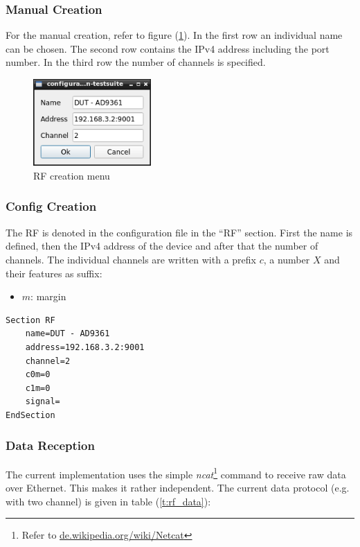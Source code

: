 \documentclass[10pt,a4paper]{article}
\begin{document}
		\subsubsection{Manual Creation}
		For the manual creation, refer to figure (\ref{f:rf_menu}). In the first row an individual name can be chosen. The second row contains the IPv4 address including the port number. In the third row the number of channels is specified.		
		
		\begin{figure}[H]
\centering
\includegraphics[width=0.4\textwidth]{./6_RF_menu.png}
\caption{RF creation menu}
\label{f:rf_menu}
		\end{figure}
			
		\subsubsection{Config Creation}
				
		The RF is denoted in the configuration file in the \enquote{RF} section. First the name is defined, then the IPv4 address of the device and after that the number of channels. The individual channels are written with a prefix $c$, a number $X$ and their features as suffix:
	
	\begin{itemize}
	\item $m$: margin
	\end{itemize}
	
\begin{lstlisting}[caption=RF Config]
Section RF
	name=DUT - AD9361
	address=192.168.3.2:9001
	channel=2
	c0m=0
	c1m=0
	signal=
EndSection
\end{lstlisting}
	
		\subsubsection{Data Reception}
		The current implementation uses the simple \textit{ncat}\footnote{Refer to \url{de.wikipedia.org/wiki/Netcat}} command to receive raw data over Ethernet. This makes it rather independent. The current data protocol (e.g. with two channel) is given in table (\ref{t:rf_data}):
		
\end{document}
